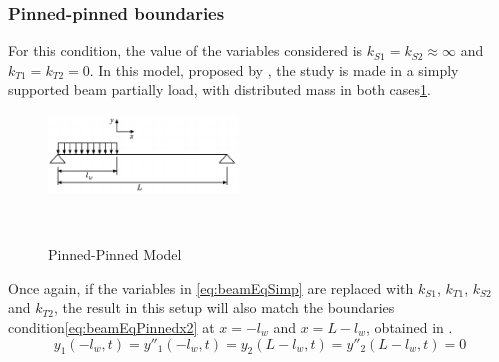    \subsubsection{Pinned-pinned boundaries}
    For this condition, the value of the variables considered is $k_{S1}=k_{S2}\approx\infty$ and $k_{T1}=k_{T2}=0$. In this model, proposed by \citeauthor{chanFREEVIBRATIONSIMPLY1996}, the study is made in a simply supported beam partially load, with distributed mass in both cases\ref{fig:pinnedpinnedmodel}.
    \begin{figure}[]
        \centering
        \includegraphics[width=0.45\textwidth]{Chapters/2CHP/Diagrams/pinnedpinnedmodel.pdf}
        \caption{Pinned-Pinned Model}{~\cite{chanFREEVIBRATIONSIMPLY1996}}
        \label{fig:pinnedpinnedmodel}
    \end{figure}
    Once again, if the variables in \ref{eq:beamEqSimp} are replaced with $k_{S1}$, $k_{T1}$, $k_{S2}$ and $k_{T2}$, the result in this setup will also match the boundaries condition\ref{eq:beamEqPinnedx2} at $x=-l_w$ and $x=L-l_w$, obtained in \cite{chanFREEVIBRATIONSIMPLY1996}.
    \begin{equation} \label{eq:beamEqPinnedx2}
        y_1(-l_w,t) = y''_1(-l_w,t) = y_2(L-l_w,t) = y''_2(L-l_w,t)=0
    \end{equation}
